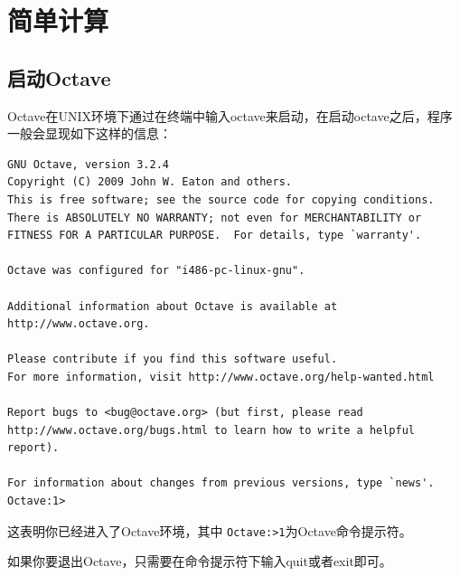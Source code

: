 \documentclass[UTF8,adobefonts]{ctexart}
\begin{document}
\section{简单计算}
\subsection{启动Octave}
Octave在UNIX环境下通过在终端中输入octave来启动，在启动octave之后，程序一般会显现如下这样的信息：
\begin{verbatim}
GNU Octave, version 3.2.4
Copyright (C) 2009 John W. Eaton and others.
This is free software; see the source code for copying conditions.
There is ABSOLUTELY NO WARRANTY; not even for MERCHANTABILITY or
FITNESS FOR A PARTICULAR PURPOSE.  For details, type `warranty'.

Octave was configured for "i486-pc-linux-gnu".

Additional information about Octave is available at http://www.octave.org.

Please contribute if you find this software useful.
For more information, visit http://www.octave.org/help-wanted.html

Report bugs to <bug@octave.org> (but first, please read
http://www.octave.org/bugs.html to learn how to write a helpful report).

For information about changes from previous versions, type `news'.
Octave:1>
\end{verbatim}
这表明你已经进入了Octave环境，其中 {\tt Octave:>1}为Octave命令提示符。

如果你要退出Octave，只需要在命令提示符下输入quit或者exit即可。
\end{document}

